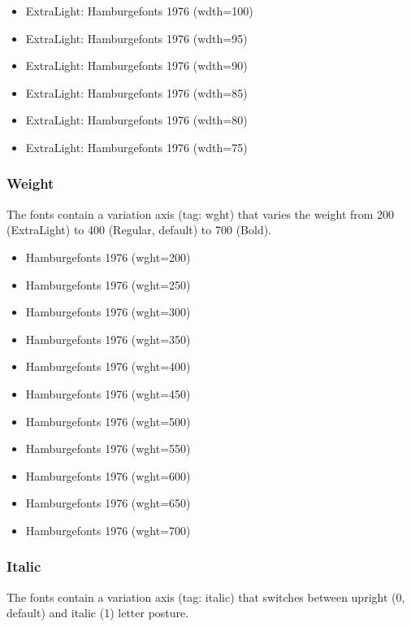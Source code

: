 \def\xtra{Hamburgefonts 1976}
\begin{itemize}
	\item { ExtraLight: \xtra{} (wdth=100)}
	\item { ExtraLight: \xtra{} (wdth=95)}
	\item { ExtraLight: \xtra{} (wdth=90)}
	\item { ExtraLight: \xtra{} (wdth=85)}
	\item { ExtraLight: \xtra{} (wdth=80)}
	\item { ExtraLight: \xtra{} (wdth=75)}
\end{itemize}

\subsubsection{Weight}

The fonts contain a variation axis (tag: wght) that varies the weight from 200 (ExtraLight) to 400 (Regular, default) to 700 (Bold).

\def\xtra{Hamburgefonts 1976}
\begin{itemize}
	\item { \xtra{} (wght=200)}
	\item { \xtra{} (wght=250)}
	\item { \xtra{} (wght=300)}
	\item { \xtra{} (wght=350)}
	\item { \xtra{} (wght=400)}
	\item { \xtra{} (wght=450)}
	\item { \xtra{} (wght=500)}
	\item { \xtra{} (wght=550)}
	\item { \xtra{} (wght=600)}
	\item { \xtra{} (wght=650)}
	\item { \xtra{} (wght=700)}
\end{itemize}

\subsubsection{Italic}

The fonts contain a variation axis (tag: italic) that switches between upright (0, default) and italic (1) letter posture.
